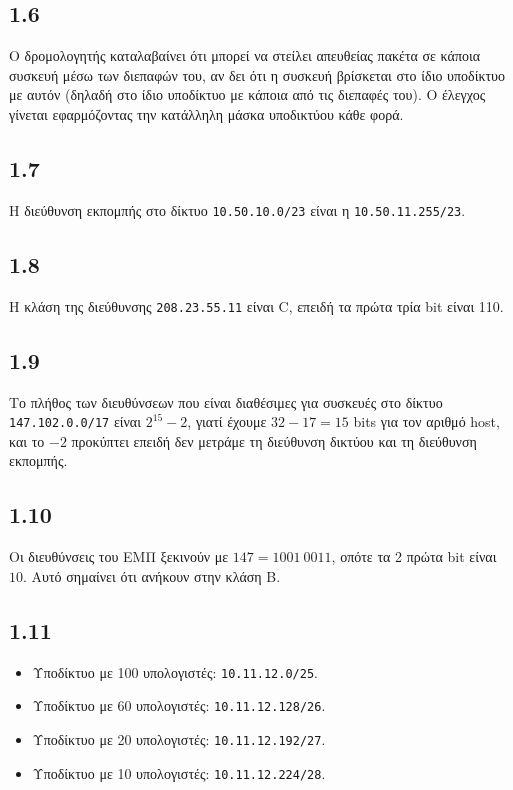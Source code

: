 \documentclass[a4paper, 12pt]{article}
\begin{document}
	\subsection*{1.6}
		Ο δρομολογητής καταλαβαίνει ότι μπορεί να στείλει απευθείας πακέτα σε κάποια συσκευή μέσω των διεπαφών του, αν δει ότι η συσκευή βρίσκεται στο ίδιο υποδίκτυο με αυτόν (δηλαδή στο ίδιο υποδίκτυο με κάποια από τις διεπαφές του). Ο έλεγχος γίνεται εφαρμόζοντας την κατάλληλη μάσκα υποδικτύου κάθε φορά.

	\subsection*{1.7}
		Η διεύθυνση εκπομπής στο δίκτυο \verb|10.50.10.0/23| είναι η \verb|10.50.11.255/23|.

	\subsection*{1.8}
		Η κλάση της διεύθυνσης \verb|208.23.55.11| είναι C, επειδή τα πρώτα τρία bit είναι 110.

	\subsection*{1.9}
		Το πλήθος των διευθύνσεων που είναι διαθέσιμες για συσκευές στο δίκτυο \verb|147.102.0.0/17| είναι $2^{15}-2$, γιατί έχουμε $32-17=15$ bits για τον αριθμό host, και το $-2$ προκύπτει επειδή δεν μετράμε τη διεύθυνση δικτύου και τη διεύθυνση εκπομπής.

	\subsection*{1.10}
		Οι διευθύνσεις του ΕΜΠ ξεκινούν με $147 = 1001 \ 0011$, οπότε τα 2 πρώτα bit είναι $10$. Αυτό σημαίνει ότι ανήκουν στην κλάση B.

	\subsection*{1.11}
		\begin{itemize}
			\item Υποδίκτυο με 100 υπολογιστές: \verb|10.11.12.0/25|.
			\item Υποδίκτυο με 60 υπολογιστές: \verb|10.11.12.128/26|.
			\item Υποδίκτυο με 20 υπολογιστές: \verb|10.11.12.192/27|.
			\item Υποδίκτυο με 10 υπολογιστές: \verb|10.11.12.224/28|.
		\end{itemize}
\end{document}
